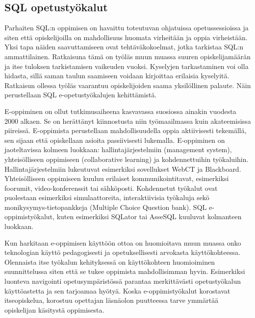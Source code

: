 \documentclass[finnish,twoside,openright]{HYgraduMLDS}
\begin{document}
\subsection{SQL opetustyökalut}

Parhaiten SQL:n oppimisen on havaittu toteutuvan ohjatuissa opetussessioissa ja siten että opiskelijoilla on mahdollisuus huomata virheitään ja oppia virheistään\cite{sadiq2004sqlator}. Yksi tapa näiden saavuttamiseen ovat tehtäväkokoelmat, jotka tarkistaa SQL:n ammattilainen. Ratkaisuna tämä on työläs muun muassa suuren opiskelijamäärän ja itse tuloksen tarkistamisen vaikeuden vuoksi. Kyselyjen tarkastaminen voi olla hidasta, sillä saman taulun saamiseen voidaan kirjoittaa erilaisia kyselyitä. Ratkaisun ollessa työläs vaarantuu opiskelijoiden saama yksilöllinen palaute. Näin perustellaan SQL e-opetustyökalujen kehittämistä.

E-oppiminen on ollut tutkimusaiheena kasvavassa suosiossa ainakin vuodesta 2000 alkaen. Se on herättänyt kiinnostusta niin työmaailmassa kuin akateemisissa piireissä. E-oppimista perustellaan mahdollisuudella oppia aktiivisesti tekemällä, sen sijaan että opiskellaan asioita passiivisesti lukemalla\cite{Brusilovsky:2010:LSP:1656255.1656257}. E-oppiminen on jaoteltavissa kolmeen luokkaan\cite{sadiq2004sqlator}: hallintajärjestelmiin (management system), yhteisölliseen oppimiseen (collaborative learning) ja kohdennettuihin työkaluihin. Hallintajärjestelmiin lukeutuvat esimerkiksi sovellukset WebCT ja Blackboard. Yhteisölliseen oppimiseen kuuluu erilaiset kommunikointitavat, esimerkiksi foorumit, video-konferenssit tai sähköposti. Kohdennetut työkalut ovat puolestaan esimerkiksi simulaattoreita, interaktiivisia työkaluja sekö monikysymys-tietopankkeja (Multiple Choice Question bank). SQL e-oppimistyökalut, kuten esimerkiksi SQLator tai AsseSQL kuuluvat kolmanteen luokkaan.

Kun harkitaan e-oppimisen käyttöön ottoa on huomioitava muun muassa onko teknologian käyttö pedagogisesti ja opetuksellisesti arvokasta käyttökohteessa\cite{sadiq2004sqlator}. Olennaista itse työkalun kehityksessä on käyttökohteen huomioiminen suunnittelussa siten että se tukee oppimista mahdollisimman hyvin. Esimerkiksi luonteva navigointi opetusympäristössä parantaa merkittävästi opetustyökalun käyttöastetta ja sen tarjoamaa hyötyä\cite{Brusilovsky:2010:LSP:1656255.1656257}. Koska e-oppimistyökalut korostavat itseopiskelua, korostuu opettajan läsnäolon puutteessa tarve ymmärtää opiskelijan käsitystä oppimisesta\cite{sadiq2004sqlator}.
\end{document}
